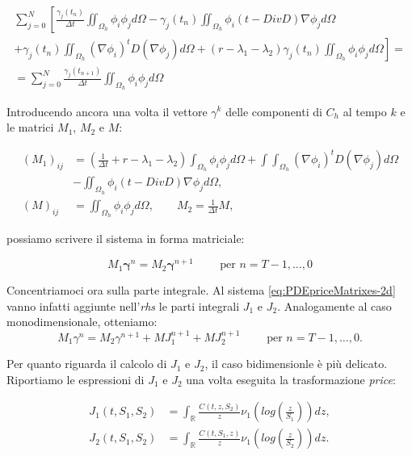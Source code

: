 \documentclass[a4paper,10pt]{report}
\theoremstyle{plain}
\theoremstyle{definition}
\theoremstyle{remark}
\begin{document}
\begin{multline*}
 \sum_{j=0}^N\left[\frac{\gamma_j(t_n)}{\Delta t}\iint_{\Omega_h}\phi_i\phi_j d\Omega -\gamma_j(t_n)\iint_{\Omega_h}\phi_i(t-Div D)\nabla\phi_j d\Omega\right.\\
 \left.+\gamma_j(t_n)\iint_{\Omega_h}(\nabla\phi_i)^t D (\nabla\phi_j) d\Omega+(r-\lambda_1-\lambda_2)\gamma_j(t_n)\iint_{\Omega_h}\phi_i\phi_j d\Omega \right]=\\
 =\sum_{j=0}^N\frac{\gamma_j(t_{n+1})}{\Delta t}\iint_{\Omega_h}\phi_i\phi_j d\Omega
\end{multline*}


Introducendo ancora una volta il vettore $\gamma^k$ delle componenti di $C_h$ al tempo $k$ e le matrici $M_1$, $M_2$ e $M$:

\begin{align*}
 (M_1)_{ij}&=\left(\frac{1}{\Delta t}+r-\lambda_1-\lambda_2\right)\int_{\Omega_h}\phi_i\phi_jd\Omega+\int\int_{\Omega_h}(\nabla\phi_i)^t D (\nabla\phi_j) d\Omega\\&
 -\iint_{\Omega_h}\phi_i(t-Div D)\nabla\phi_j d\Omega,\\
 (M)_{ij}&=\iint_{\Omega_h}\phi_i\phi_j d\Omega, \qquad M_2=\frac{1}{\Delta t}M,
\end{align*}

possiamo scrivere il sistema in forma matriciale:

\begin{equation}
 \label{eq:PDEpriceMatrixes-2d}
 M_1 \bm{\gamma}^n=M_2\bm{\gamma}^{n+1} \qquad \text{ per } n=T-1,\dots,0
\end{equation}

Concentriamoci ora sulla parte integrale. Al sistema \eqref{eq:PDEpriceMatrixes-2d} vanno infatti aggiunte nell'\emph{rhs} le parti integrali $J_1$ e $J_2$. Analogamente al caso monodimensionale, otteniamo:
\begin{equation}
 \label{eq:PDEpriceMatrixeswithJ-2d}
 M_1 \gamma^n=M_2\gamma^{n+1}+MJ_1^{n+1}+MJ_2^{n+1}\qquad \text{ per } n=T-1,\dots,0.
\end{equation}

Per quanto riguarda il calcolo di $J_1$ e $J_2$, il caso bidimensionle è più delicato. Riportiamo le espressioni di $J_1$ e $J_2$ una volta eseguita la trasformazione \emph{price}:

\begin{align*}
 J_1(t,S_1,S_2)&= \int_\mathbb{R} \frac{C(t,z,S_2)}{z}\nu_1\left(log\left(\frac{z}{S_1}\right)\right)dz,\\
 J_2(t,S_1,S_2)&= \int_\mathbb{R} \frac{C(t,S_1,z)}{z}\nu_1\left(log\left(\frac{z}{S_2}\right)\right)dz.
\end{align*}
\end{document}
